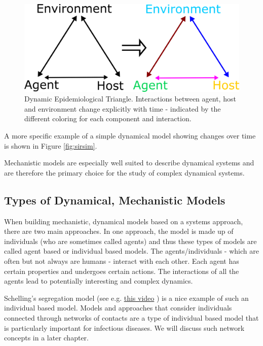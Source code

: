 \documentclass[]{book}
\theoremstyle{definition}
\theoremstyle{definition}
\theoremstyle{definition}
\theoremstyle{remark}
\begin{document}
\begin{figure}
\centering
\includegraphics{./images/moving-triangle.png}
\caption{\label{fig:dynamictriangle}Dynamic Epidemiological Triangle.
Interactions between agent, host and environment change explicitly with
time - indicated by the different coloring for each component and
interaction.}
\end{figure}

A more specific example of a simple dynamical model showing changes over
time is shown in Figure \ref{fig:sirsim}.

Mechanistic models are especially well suited to describe dynamical
systems and are therefore the primary choice for the study of complex
dynamical systems.

\subsection{Types of Dynamical, Mechanistic
Models}\label{types-of-dynamical-mechanistic-models}

When building mechanistic, dynamical models based on a systems approach,
there are two main approaches. In one approach, the model is made up of
individuals (who are sometimes called agents) and thus these types of
models are called agent based or individual based models. The
agents/individuals - which are often but not always are humans -
interact with each other. Each agent has certain properties and
undergoes certain actions. The interactions of all the agents lead to
potentially interesting and complex dynamics.

Schelling's segregation model (see e.g.
\href{https://youtu.be/dFl3Cfw12bo}{this video} ) is a nice example of
such an individual based model. Models and approaches that consider
individuals connected through networks of contacts are a type of
individual based model that is particularly important for infectious
diseases. We will discuss such network concepts in a later chapter.
\end{document}
